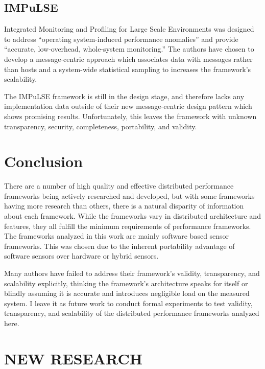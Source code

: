\subsection{IMPuLSE}

Integrated Monitoring and Profiling for Large Scale Environments \cite{bridges2004} was designed to address ``operating
system-induced performance anomalies'' and provide ``accurate, low-overhead, whole-system monitoring.'' The authors have
chosen to develop a message-centric approach which associates data with messages rather than hosts and a system-wide
statistical sampling to increases the framework's scalability.

The IMPuLSE framework is still in the design stage, and therefore lacks any implementation data outside of their new
message-centric design pattern which shows promising results. Unfortunately, this leaves the framework with unknown
transparency, security, completeness, portability, and validity.

\section{Conclusion}

There are a number of high quality and effective distributed performance frameworks being actively researched and
developed, but with some frameworks having more research than others, there is a natural disparity of information about
each framework. While the frameworks vary in distributed architecture and features, they all fulfill the minimum
requirements of performance frameworks. The frameworks analyzed in this work are mainly software based sensor
frameworks. This was chosen due to the inherent portability advantage of software sensors over hardware or hybrid
sensors.

Many authors have failed to address their framework's validity, transparency, and scalability explicitly, thinking the
framework's architecture speaks for itself or blindly assuming it is accurate and introduces negligible load on the
measured system. I leave it as future work to conduct formal experiments to test validity, transparency, and scalability
of the distributed performance frameworks analyzed here.

\section{NEW RESEARCH}

